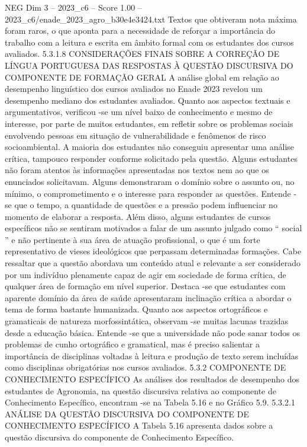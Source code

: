 \begin{textsample}{NEG Dim 3 – 2023\_c6 – Score 1.00 – 2023\_c6/enade\_2023\_agro\_b30e4e3424.txt}
Textos que obtiveram nota máxima foram raros, o que aponta para a necessidade de reforçar a importância do trabalho com a leitura e escrita em âmbito formal com os estudantes dos cursos avaliados. 5.3.1.8 CONSIDERAÇÕES FINAIS SOBRE A CORREÇÃO DE LÍNGUA PORTUGUESA DAS RESPOSTAS À QUESTÃO DISCURSIVA DO COMPONENTE DE FORMAÇÃO GERAL A análise global em relação ao desempenho linguístico dos cursos avaliados no Enade 2023 revelou um desempenho mediano dos estudantes avaliados.
Quanto aos aspectos textuais e argumentativos, verificou -se um nível baixo de conhecimento e mesmo de interesse, por parte de muitos estudantes, em refletir sobre os problemas sociais envolvendo pessoas em situação de vulnerabilidade e fenômenos de risco socioambiental.
A maioria dos estudantes não conseguiu apresentar uma análise crítica, tampouco responder conforme solicitado pela questão.
Alguns estudantes não foram atentos às informações apresentadas nos textos nem ao que os enunciados solicitavam.
Alguns demonstraram o domínio sobre o assunto ou, no mínimo, o comprometimento e o interesse para responder as questões.
Entende -se que o tempo, a quantidade de questões e a pressão podem influenciar no momento de elaborar a resposta.
Além disso, alguns estudantes de cursos específicos não se sentiram motivados a falar de um assunto julgado como “ social ” e não pertinente à sua área de atuação profissional, o que é um forte representativo de vieses ideológicos que perpassam determinadas formações.
Cabe ressaltar que a questão abordava um conteúdo atual e relevante a ser considerado por um indivíduo plenamente capaz de agir em sociedade de forma crítica, de qualquer área de formação em nível superior.
Destaca -se que estudantes com aparente domínio da área de saúde apresentaram inclinação crítica a abordar o tema de forma bastante humanizada.
Quanto aos aspectos ortográficos e gramaticais de natureza morfossintática, observam -se muitas lacunas trazidas desde a educação básica.
Entende -se que a universidade não pode sanar todos os problemas de cunho ortográfico e gramatical, mas é preciso salientar a importância de disciplinas voltadas à leitura e produção de texto serem incluídas como disciplinas obrigatórias nos cursos avaliados. 5.3.2 COMPONENTE DE CONHECIMENTO ESPECÍFICO As análises dos resultados de desempenho dos estudantes de Agronomia, na questão discursiva relativa ao componente de Conhecimento Específico, encontram -se na Tabela 5.16 e no Gráfico 5.9. 5.3.2.1 ANÁLISE DA QUESTÃO DISCURSIVA DO COMPONENTE DE CONHECIMENTO ESPECÍFICO A Tabela 5.16 apresenta dados sobre a questão discursiva do componente de Conhecimento Específico.

\end{textsample}
